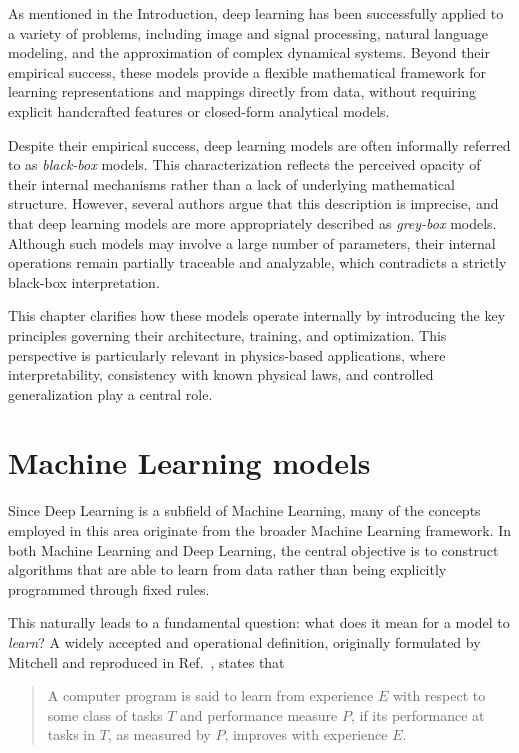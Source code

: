 As mentioned in the Introduction, deep learning has been successfully applied to a variety of problems, including image and signal processing, natural language modeling, and the approximation of complex dynamical systems. Beyond their empirical success, these models provide a flexible mathematical framework for learning representations and mappings directly from data, without requiring explicit handcrafted features or closed-form analytical models.

Despite their empirical success, deep learning models are often informally referred to as \textit{black-box} models. This characterization reflects the perceived opacity of their internal mechanisms rather than a lack of underlying mathematical structure. However, several authors argue that this description is imprecise, and that deep learning models are more appropriately described as \textit{grey-box} models. Although such models may involve a large number of parameters, their internal operations remain partially traceable and analyzable, which contradicts a strictly black-box interpretation.

This chapter clarifies how these models operate internally by introducing the key principles governing their architecture, training, and optimization. This perspective is particularly relevant in physics-based applications, where interpretability, consistency with known physical laws, and controlled generalization play a central role.

\section{Machine Learning models}
\label{sec:ml_models}

Since Deep Learning is a subfield of Machine Learning, many of the concepts employed in this area originate from the broader Machine Learning framework. In both Machine Learning and Deep Learning, the central objective is to construct algorithms that are able to learn from data rather than being explicitly programmed through fixed rules.

This naturally leads to a fundamental question: what does it mean for a model to \emph{learn}? A widely accepted and operational definition, originally formulated by Mitchell and reproduced in Ref.~\cite{Goodfellow2016}, states that
\begin{quote}
    A computer program is said to learn from experience $E$ with respect to some class of tasks $T$ and performance measure $P$, if its performance at tasks in $T$, as measured by $P$, improves with experience $E$.
\end{quote}

